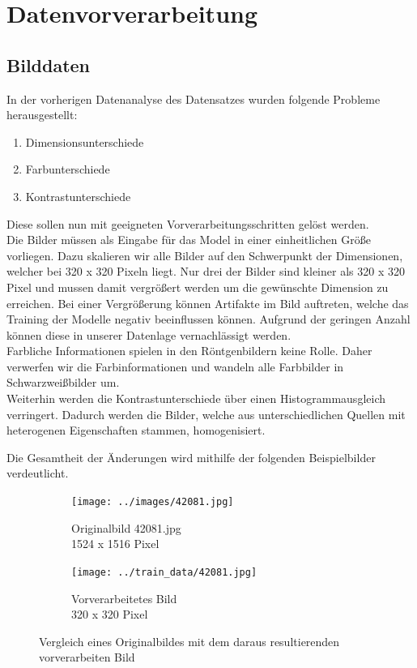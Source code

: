 \chapter{Datenvorverarbeitung}
\label{ch:data_preprocessing}

\section{Bilddaten}

In der vorherigen Datenanalyse des Datensatzes wurden folgende Probleme herausgestellt:

\begin{enumerate}
	\item{Dimensionsunterschiede}
	\item{Farbunterschiede}
	\item{Kontrastunterschiede}
\end{enumerate}

Diese sollen nun mit geeigneten Vorverarbeitungsschritten gelöst werden.\\
Die Bilder müssen als Eingabe für das Model in einer einheitlichen Größe vorliegen. Dazu skalieren wir alle Bilder auf den Schwerpunkt der Dimensionen, welcher bei 320 x 320 Pixeln liegt.
Nur drei der Bilder sind kleiner als 320 x 320 Pixel und mussen damit vergrößert werden um die gewünschte Dimension zu erreichen. Bei einer Vergrößerung können Artifakte im Bild auftreten, welche das Training der Modelle negativ beeinflussen können. Aufgrund der geringen Anzahl können diese in unserer Datenlage vernachlässigt werden.\\
Farbliche Informationen spielen in den Röntgenbildern keine Rolle. Daher verwerfen wir die Farbinformationen und wandeln alle Farbbilder in Schwarzweißbilder um.\\
Weiterhin werden die Kontrastunterschiede über einen Histogrammausgleich verringert. Dadurch werden die Bilder, welche aus unterschiedlichen Quellen mit heterogenen Eigenschaften stammen, homogenisiert.

\pagebreak

Die Gesamtheit der Änderungen wird mithilfe der folgenden Beispielbilder verdeutlicht.

\begin{figure}[H]
	\centering
	\begin{subfigure}[t]{0.45\textwidth}
		\centering
		\texttt{[image: ../images/42081.jpg]}
		\caption{Originalbild 42081.jpg\\1524 x 1516 Pixel}
	\end{subfigure} \hfill
	\begin{subfigure}[t]{0.45\textwidth}
		\centering
		\texttt{[image: ../train\_data/42081.jpg]}
		\caption{Vorverarbeitetes Bild\\320 x 320 Pixel}
	\end{subfigure} \hfill
	\caption{Vergleich eines Originalbildes mit dem daraus resultierenden vorverarbeiten Bild}
\end{figure}

